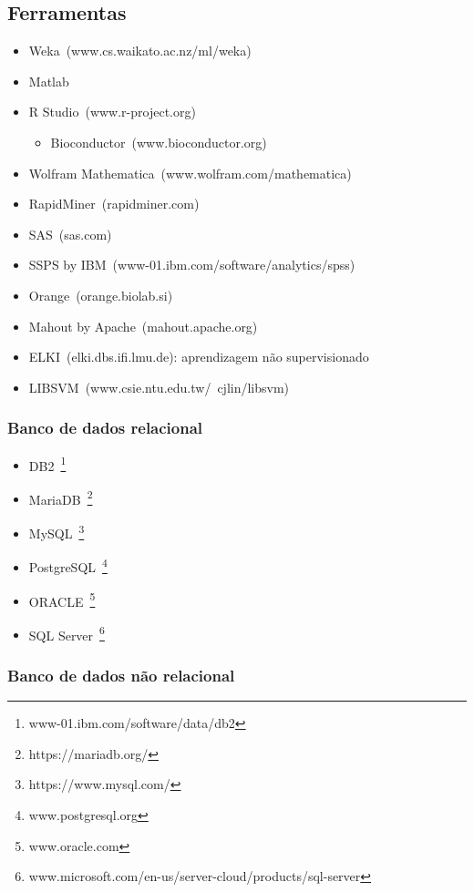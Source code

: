 \subsection*{Ferramentas}

\begin{itemize}
	\item Weka~(www.cs.waikato.ac.nz/ml/weka)
	\item Matlab
	\item R Studio~(www.r-project.org)
	      \begin{itemize}
		      \item Bioconductor~(www.bioconductor.org)
	      \end{itemize}
	\item Wolfram Mathematica~(www.wolfram.com/mathematica)
	\item RapidMiner~(rapidminer.com)
	\item SAS~(sas.com)
	\item SSPS by IBM~(www-01.ibm.com/software/analytics/spss)
	\item Orange~(orange.biolab.si)
	\item Mahout by Apache~(mahout.apache.org)
	\item ELKI~(elki.dbs.ifi.lmu.de): aprendizagem não supervisionado
	\item LIBSVM~(www.csie.ntu.edu.tw/~cjlin/libsvm)
\end{itemize}


\subsubsection*{Banco de dados relacional}
\begin{itemize}
	\item DB2~\footnote{www-01.ibm.com/software/data/db2}
	\item MariaDB~\footnote{https://mariadb.org/}
	\item MySQL~\footnote{https://www.mysql.com/}
	\item PostgreSQL~\footnote{www.postgresql.org}
	\item ORACLE~\footnote{www.oracle.com}
	\item SQL Server~\footnote{www.microsoft.com/en-us/server-cloud/products/sql-server}
\end{itemize}
	

\subsubsection*{Banco de dados não relacional}

